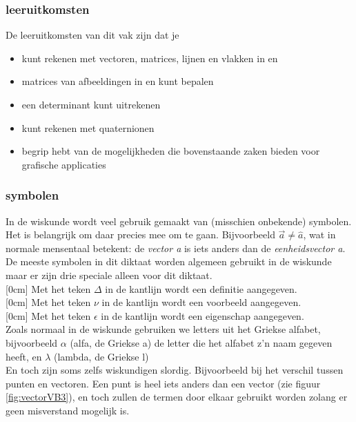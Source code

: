 \subsubsection*{leeruitkomsten}
De leeruitkomsten van dit vak zijn dat je
\begin{itemize}
        \setlength\itemsep{-1pt}
        \item kunt rekenen met vectoren, matrices, lijnen en vlakken  in \RT en \RD
        \item matrices van afbeeldingen in \RT en \RD kunt bepalen
        \item een determinant kunt uitrekenen
        \item kunt rekenen met quaternionen
        \item begrip hebt van de mogelijkheden die bovenstaande zaken bieden voor grafische applicaties
        \newline
    \end{itemize}

    


\subsubsection{symbolen}
In de wiskunde wordt veel gebruik gemaakt van (misschien onbekende) symbolen. Het is belangrijk om daar precies mee om te gaan. Bijvoorbeeld $ \vec{a} \ne \hat{a} $, wat in normale mensentaal betekent: de \textit{vector a} is iets anders dan de \textit{eenheidsvector a}. De meeste symbolen in dit diktaat worden algemeen gebruikt in de wiskunde maar er zijn drie speciale alleen voor dit diktaat.\\
[0cm]
Met het teken {\Large $ \Delta $ }in de kantlijn wordt een definitie aangegeven.\\
[0cm]
Met het teken {\LARGE $ \nu $ }  in de kantlijn wordt een voorbeeld aangegeven.\\
[0cm]
Met het teken {\LARGE $ \epsilon $ }  in de kantlijn wordt  een eigenschap aangegeven.\\
Zoals normaal in de wiskunde gebruiken we letters uit het Griekse alfabet, bijvoorbeeld $ \alpha $ (alfa, de Griekse a) de letter die het alfabet z'n naam gegeven heeft, en  $ \lambda $ (lambda, de Griekse l)\\
En toch zijn soms zelfs wiskundigen slordig. Bijvoorbeeld bij het verschil tussen punten en vectoren. Een punt is heel iets anders dan een vector  (zie figuur \ref{fig:vectorVB3}), en toch zullen de termen door elkaar gebruikt worden zolang er geen misverstand mogelijk is.

